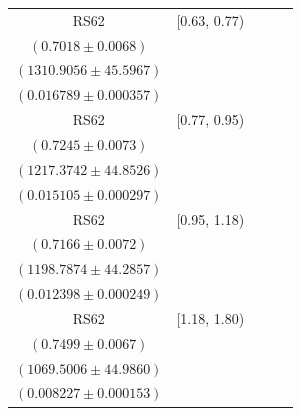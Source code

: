 {\begin{longtable}{|c|c|c|c|c|}
RS62 & [0.63, 0.77) & \begin{tabular}{@{}c@{}}$0.7099 \pm 0.0085$ \\ $(0.7018 \pm 0.0068)$\end{tabular} & \begin{tabular}{@{}c@{}}$1293.1758 \pm 45.1220$ \\ $(1310.9056 \pm 45.5967)$\end{tabular} & \begin{tabular}{@{}c@{}}$0.015061 \pm 0.000633$ \\ $(0.016789 \pm 0.000357)$\end{tabular} \\ \hline
RS62 & [0.77, 0.95) & \begin{tabular}{@{}c@{}}$0.7097 \pm 0.0086$ \\ $(0.7245 \pm 0.0073)$\end{tabular} & \begin{tabular}{@{}c@{}}$1247.0405 \pm 45.8115$ \\ $(1217.3742 \pm 44.8526)$\end{tabular} & \begin{tabular}{@{}c@{}}$0.013884 \pm 0.000534$ \\ $(0.015105 \pm 0.000297)$\end{tabular} \\ \hline
RS62 & [0.95, 1.18) & \begin{tabular}{@{}c@{}}$0.7077 \pm 0.0085$ \\ $(0.7166 \pm 0.0072)$\end{tabular} & \begin{tabular}{@{}c@{}}$1222.3132 \pm 44.9750$ \\ $(1198.7874 \pm 44.2857)$\end{tabular} & \begin{tabular}{@{}c@{}}$0.011893 \pm 0.000457$ \\ $(0.012398 \pm 0.000249)$\end{tabular} \\ \hline
RS62 & [1.18, 1.80) & \begin{tabular}{@{}c@{}}$0.6767 \pm 0.0099$ \\ $(0.7499 \pm 0.0067)$\end{tabular} & \begin{tabular}{@{}c@{}}$1186.6758 \pm 49.8745$ \\ $(1069.5006 \pm 44.9860)$\end{tabular} & \begin{tabular}{@{}c@{}}$0.008053 \pm 0.000282$ \\ $(0.008227 \pm 0.000153)$\end{tabular} \\ \hline
\end{longtable}
}
